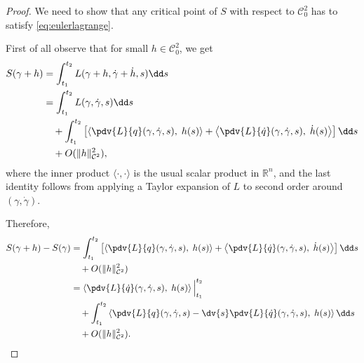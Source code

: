 \documentclass[english,fontsize=11pt,paper=b5]{scrbook}
\theoremstyle{definition}
\begin{document}
  \begin{proof}
    We need to show that any critical point of $S$ with respect to $\mathcal{C}^2_0$ has to satisfy \eqref{eq:eulerlagrange}.

    First of all observe that for small $h\in \mathcal{C}^2_0$, we get
    \begin{align}
      S(\gamma + h) &= \int_{t_1}^{t_2} L(\gamma + h, \dot \gamma + \dot h, s) \dd s \\
                    &= \int_{t_1}^{t_2} %
                    L(\gamma, \dot \gamma, s) \dd s \\
                    &\quad + \int_{t_1}^{t_2} \left[
                      \left\langle
                        \pdv{L}{q}(\gamma, \dot \gamma, s),\;
                        h(s)
                      \right\rangle
                      + \left\langle
                        \pdv{L}{\dot q}(\gamma, \dot \gamma, s),\;
                        \dot h(s)
                      \right\rangle
                    \right] \dd s \\
                    &\quad + O(\|h\|^2_{\mathcal{C}^2}),
    \end{align}
    where the inner product $\langle\cdot,\cdot\rangle$ is the usual scalar product in $\mathbb{R}^n$, and the last identity follows from applying a Taylor expansion of $L$ to second order around $(\gamma, \dot \gamma)$.

    Therefore,
    \begin{align}
      S(\gamma+h) - S(\gamma) &= \int_{t_1}^{t_2} \left[
        \left\langle\pdv{L}{q}(\gamma, \dot \gamma, s),\; h(s)\right\rangle
        + \left\langle\pdv{L}{\dot q}(\gamma, \dot \gamma, s),\; \dot h(s)\right\rangle
      \right] \dd s\\
                              &\quad + O(\|h\|^2_{\mathcal{C}^2})\\
                              &= \left\langle\pdv{L}{\dot q}(\gamma, \dot \gamma, s),\; h(s)\right\rangle \Big|_{t_1}^{t_2} \\
                              &\quad + \int_{t_1}^{t_2} \left\langle
                                \pdv{L}{q}(\gamma, \dot \gamma, s)
                                - \dv{s}\pdv{L}{\dot q}(\gamma, \dot \gamma, s)
                              ,\; h(s)\right\rangle \dd s\\
                              &\quad + O(\|h\|^2_{\mathcal{C}^2}).
      \end{align}


\end{proof}
\end{document}
